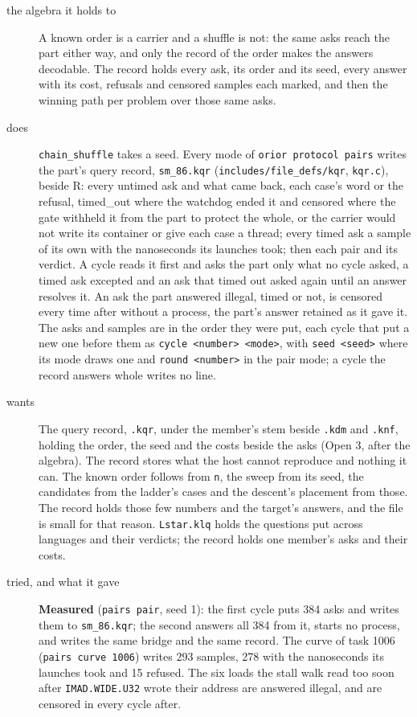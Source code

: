 \begin{description}
\item[{the algebra it holds to}] A known order is a carrier and a shuffle is not: the same asks reach the part either way, and only the record of the order makes the answers decodable. The record holds every ask, its order and its seed, every answer with its cost, refusals and censored samples each marked, and then the winning path per problem over those same asks.
\item[{does}] \texttt{chain\_\allowbreak{}shuffle} takes a seed. Every mode of \texttt{orior protocol pairs} writes the part's query record, \texttt{sm\_\allowbreak{}86.\allowbreak{}kqr} (\texttt{includes/\allowbreak{}file\_\allowbreak{}defs/\allowbreak{}kqr}, \texttt{kqr.\allowbreak{}c}), beside R: every untimed ask and what came back, each case's word or the refusal, timed\_\allowbreak{}out where the watchdog ended it and censored where the gate withheld it from the part to protect the whole, or the carrier would not write its container or give each case a thread; every timed ask a sample of its own with the nanoseconds its launches took; then each pair and its verdict. A cycle reads it first and asks the part only what no cycle asked, a timed ask excepted and an ask that timed out asked again until an answer resolves it. An ask the part answered illegal, timed or not, is censored every time after without a process, the part's answer retained as it gave it. The asks and samples are in the order they were put, each cycle that put a new one before them as \texttt{cycle <number> <mode>}, with \texttt{seed <seed>} where its mode draws one and \texttt{round <number>} in the pair mode; a cycle the record answers whole writes no line.
\item[{wants}] The query record, \texttt{.\allowbreak{}kqr}, under the member's stem beside \texttt{.\allowbreak{}kdm} and \texttt{.\allowbreak{}knf}, holding the order, the seed and the costs beside the asks (Open 3, after the algebra). The record stores what the host cannot reproduce and nothing it can. The known order follows from \texttt{n}, the sweep from its seed, the candidates from the ladder's cases and the descent's placement from those. The record holds those few numbers and the target's answers, and the file is small for that reason. \texttt{Lstar.\allowbreak{}klq} holds the questions put across languages and their verdicts; the record holds one member's asks and their costs.
\item[{tried, and what it gave}] \textbf{Measured} (\texttt{pairs pair}, seed 1): the first cycle puts 384 asks and writes them to \texttt{sm\_\allowbreak{}86.\allowbreak{}kqr}; the second answers all 384 from it, starts no process, and writes the same bridge and the same record. The curve of task 1006 (\texttt{pairs curve 1006}) writes 293 samples, 278 with the nanoseconds its launches took and 15 refused. The six loads the stall walk read too soon after \texttt{IMAD.\allowbreak{}WIDE.\allowbreak{}U32} wrote their address are answered illegal, and are censored in every cycle after.

\end{description}
